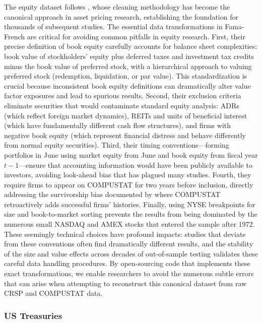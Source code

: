 \documentclass{article}
\begin{document}
\begin{appendices}
The equity dataset follows \cite{Fama1993}, whose cleaning methodology has become the canonical approach in asset pricing research, establishing the foundation for thousands of subsequent studies. The essential data transformations in Fama-French are critical for avoiding common pitfalls in equity research. First, their precise definition of book equity carefully accounts for balance sheet complexities: book value of stockholders' equity plus deferred taxes and investment tax credits minus the book value of preferred stock, with a hierarchical approach to valuing preferred stock (redemption, liquidation, or par value). This standardization is crucial because inconsistent book equity definitions can dramatically alter value factor exposures and lead to spurious results. Second, their exclusion criteria eliminate securities that would contaminate standard equity analysis: ADRs (which reflect foreign market dynamics), REITs and units of beneficial interest (which have fundamentally different cash flow structures), and firms with negative book equity (which represent financial distress and behave differently from normal equity securities). Third, their timing conventions—forming portfolios in June using market equity from June and book equity from fiscal year $t-1$—ensure that accounting information would have been publicly available to investors, avoiding look-ahead bias that has plagued many studies. Fourth, they require firms to appear on COMPUSTAT for two years before inclusion, directly addressing the survivorship bias documented by \cite{Banz1986} where COMPUSTAT retroactively adds successful firms' histories. Finally, using NYSE breakpoints for size and book-to-market sorting prevents the results from being dominated by the numerous small NASDAQ and AMEX stocks that entered the sample after 1972. These seemingly technical choices have profound impacts: studies that deviate from these conventions often find dramatically different results, and the stability of the size and value effects across decades of out-of-sample testing validates these careful data handling procedures. By open-sourcing code that implements these exact transformations, we enable researchers to avoid the numerous subtle errors that can arise when attempting to reconstruct this canonical dataset from raw CRSP and COMPUSTAT data.

\subsubsection{US Treasuries}
\label{sec:treasuries}


\end{appendices}
\end{document}
